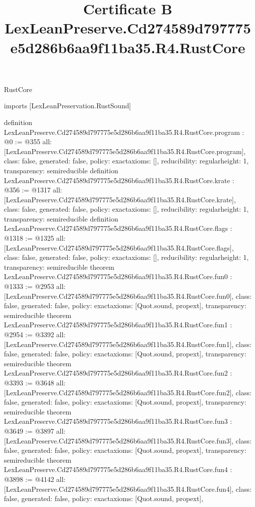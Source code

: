 \begin{lexlean}{RustCore}
\title{Certificate B LexLeanPreserve.Cd274589d797775e5d286b6aa9f11ba35.R4.RustCore}
\begin{coremodule}
imports [LexLeanPreservation.RustSound]

definition LexLeanPreserve.Cd274589d797775e5d286b6aa9f11ba35.R4.RustCore.program : @0 := @355 {
  all: [LexLeanPreserve.Cd274589d797775e5d286b6aa9f11ba35.R4.RustCore.program],
  class: false,
  generated: false,
  policy: exact{axioms: []},
  reducibility: regular{height: 1},
  transparency: semireducible
}
definition LexLeanPreserve.Cd274589d797775e5d286b6aa9f11ba35.R4.RustCore.krate : @356 := @1317 {
  all: [LexLeanPreserve.Cd274589d797775e5d286b6aa9f11ba35.R4.RustCore.krate],
  class: false,
  generated: false,
  policy: exact{axioms: []},
  reducibility: regular{height: 1},
  transparency: semireducible
}
definition LexLeanPreserve.Cd274589d797775e5d286b6aa9f11ba35.R4.RustCore.flags : @1318 := @1325 {
  all: [LexLeanPreserve.Cd274589d797775e5d286b6aa9f11ba35.R4.RustCore.flags],
  class: false,
  generated: false,
  policy: exact{axioms: []},
  reducibility: regular{height: 1},
  transparency: semireducible
}
theorem LexLeanPreserve.Cd274589d797775e5d286b6aa9f11ba35.R4.RustCore.fun0 : @1333 := @2953 {
  all: [LexLeanPreserve.Cd274589d797775e5d286b6aa9f11ba35.R4.RustCore.fun0],
  class: false,
  generated: false,
  policy: exact{axioms: [Quot.sound, propext]},
  transparency: semireducible
}
theorem LexLeanPreserve.Cd274589d797775e5d286b6aa9f11ba35.R4.RustCore.fun1 : @2954 := @3392 {
  all: [LexLeanPreserve.Cd274589d797775e5d286b6aa9f11ba35.R4.RustCore.fun1],
  class: false,
  generated: false,
  policy: exact{axioms: [Quot.sound, propext]},
  transparency: semireducible
}
theorem LexLeanPreserve.Cd274589d797775e5d286b6aa9f11ba35.R4.RustCore.fun2 : @3393 := @3648 {
  all: [LexLeanPreserve.Cd274589d797775e5d286b6aa9f11ba35.R4.RustCore.fun2],
  class: false,
  generated: false,
  policy: exact{axioms: [Quot.sound, propext]},
  transparency: semireducible
}
theorem LexLeanPreserve.Cd274589d797775e5d286b6aa9f11ba35.R4.RustCore.fun3 : @3649 := @3897 {
  all: [LexLeanPreserve.Cd274589d797775e5d286b6aa9f11ba35.R4.RustCore.fun3],
  class: false,
  generated: false,
  policy: exact{axioms: [Quot.sound, propext]},
  transparency: semireducible
}
theorem LexLeanPreserve.Cd274589d797775e5d286b6aa9f11ba35.R4.RustCore.fun4 : @3898 := @4142 {
  all: [LexLeanPreserve.Cd274589d797775e5d286b6aa9f11ba35.R4.RustCore.fun4],
  class: false,
  generated: false,
  policy: exact{axioms: [Quot.sound, propext]},
}
\end{coremodule}
\end{lexlean}
